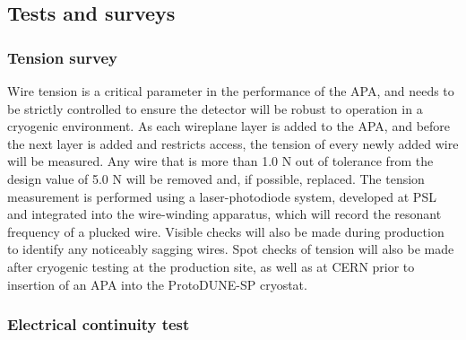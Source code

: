 \subsection{Tests and surveys}


 \subsubsection{Tension survey}

Wire tension is a critical parameter in the performance of the APA, and needs to be strictly controlled to ensure the detector will be robust to operation in a cryogenic environment.  As each wireplane layer is added to the APA, and before the next layer is added and restricts access, the tension of every newly added wire will be measured.  Any wire that is more than 1.0 N out of tolerance from the design value of 5.0 N will be removed and, if possible, replaced.  The tension measurement is performed using a laser-photodiode system, developed at PSL and integrated into the wire-winding apparatus, which will record the resonant frequency of a plucked wire.  Visible checks will also be made during production to identify any noticeably sagging wires.  Spot checks of tension will also be made after cryogenic testing at the production site, as well as at CERN prior to insertion of an APA into the ProtoDUNE-SP cryostat.  

\subsubsection{Electrical continuity test}

